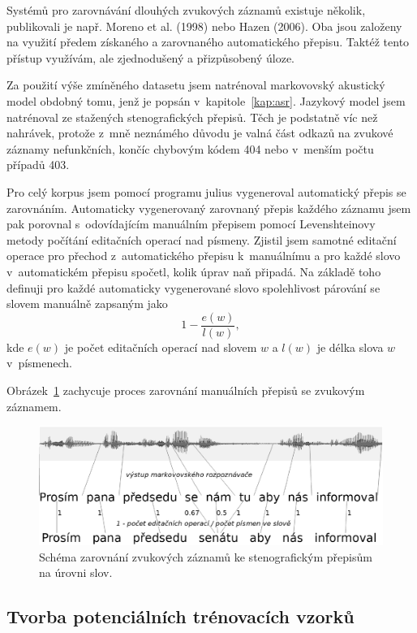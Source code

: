 Systémů pro zarovnávání dlouhých zvukových záznamů existuje několik, publikovali
je např. Moreno et al. (1998)\cite{moreno1998recursive} nebo
Hazen (2006)\cite{hazen2006automatic}. Oba jsou založeny na využití předem získaného a
zarovnaného automatického přepisu. Taktéž tento přístup využívám, ale
zjednodušený a přizpůsobený úloze.

Za použití výše zmíněného datasetu\cite{pspdata} jsem natrénoval markovovský
akustický model obdobný tomu, jenž je popsán v~kapitole~\ref{kap:asr}. Jazykový
model jsem natrénoval ze stažených stenografických přepisů. Těch je podstatně
víc než nahrávek, protože z~mně neznámého důvodu je valná část odkazů na zvukové
záznamy nefunkčních, končíc chybovým kódem 404 nebo v~menším počtu případů 403.

Pro celý korpus jsem pomocí programu julius vygeneroval automatický přepis se
zarovnáním. Automaticky vygenerovaný zarovnaný přepis každého záznamu jsem pak
porovnal s~odovídajícím manuálním přepisem pomocí Levenshteinovy metody počítání
editačních operací nad písmeny. Zjistil jsem samotné editační operace pro přechod
z~automatického přepisu k~manuálnímu a pro každé slovo v~automatickém přepisu
spočetl, kolik úprav naň připadá. Na základě toho definuji pro každé automaticky
vygenerované slovo spolehlivost párování se slovem manuálně zapsaným jako
\begin{equation}1 - \frac{e(w)}{l(w)},\end{equation}
kde $e(w)$ je počet editačních operací nad slovem $w$ a $l(w)$ je délka slova
$w$ v~písmenech.

Obrázek~\ref{fig:svolocz:align} zachycuje proces zarovnání manuálních přepisů se
zvukovým záznamem.

\begin{figure}[htpb]
\includegraphics[scale=0.4]{rc/svolocz-align.eps}
\caption{Schéma zarovnání zvukových záznamů ke stenografickým přepisům na úrovni
slov.}
\label{fig:svolocz:align}
\end{figure}

\subsection{Tvorba potenciálních trénovacích vzorků}

